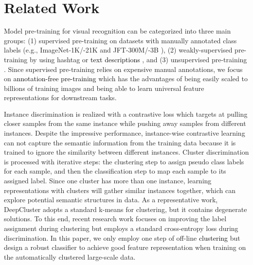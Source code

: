 \documentclass{article} \usepackage{iclr2023_conference,times}
\begin{document}
\section{Related Work}
 Model pre-training for visual recognition can be categorized into three main groups: (1) supervised pre-training on datasets with manually annotated class labels (e.g., ImageNet-1K/-21K \citep{deng2009imagenet} and JFT-300M/-3B \citep{dosovitskiy2021image,zhai2022scaling}), (2) weakly-supervised pre-training by using hashtag \citep{mahajan2018exploring,singh2022revisiting} or \textcolor{black}{text descriptions \citep{radford2021learning,jia2021scaling}}, and (3) unsupervised pre-training \citep{chen2020big,he2020momentum,caron2018deep}. Since supervised pre-training relies on expensive manual annotations, we focus on \textcolor{black}{annotation-free pre-training} which has the advantages of being easily scaled to billions of training images and being able to learn universal feature representations for downstream tasks. 

 Instance discrimination \citep{chen2020big,he2020momentum,radford2021learning} is realized with a contrastive loss which targets at pulling closer samples from the same instance while pushing away samples from different instances. Despite the impressive performance, instance-wise contrastive learning can not capture the semantic information from the training data because it is trained to ignore the similarity between different instances. Cluster discrimination \citep{caron2018deep,zhan2020online,li2020prototypical} is processed with iterative steps: the clustering step to assign pseudo class labels for each sample, and then the classification step to map each sample to its assigned label. 
Since one cluster has more than one instance, learning representations with clusters will gather similar instances together, which can explore potential semantic structures in data. As a representative work, DeepCluster \citep{caron2018deep} adopts a standard k-means for clustering, but it contains degenerate solutions. To this end, recent research work \citep{asano2019self,caron2020unsupervised,qian2022unsupervised} focuses on improving the label assignment during clustering but employs a standard cross-entropy loss during discrimination. 
In this paper, we only employ one step of off-line \textcolor{black}{clustering} but design a robust classifier to achieve good feature representation when training on the automatically clustered large-scale data.
\end{document}
